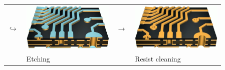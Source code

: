 \documentclass{beamer}
\begin{document}
\begin{frame}
\begin{center}
\begin{tabular}{m{0.05\linewidth} m{0.38\linewidth} m{0.05\linewidth} m{0.38\linewidth}}
			 \Large\textbf{$\hookrightarrow$} & \includegraphics[scale=0.12]{obr15_vnejsiLeptani.png} & \Large\textbf{$\rightarrow$} & \includegraphics[scale=0.12]{obr16_vnejsiHotovo.png}\\
			& Etching & & Resist cleaning
			\end{tabular}
		\end{center}
	\end{frame}
\end{document}
